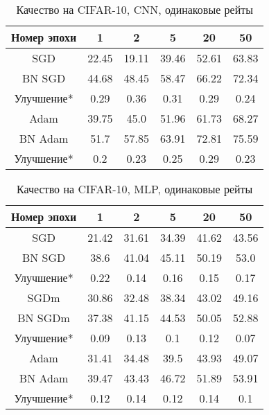 \documentclass[12pt,oneside]{article}
\begin{document}
\begin{table}
\centering
\begin{tabular}{|c|c|c|c|c|c|}\hline
Номер эпохи & 1 & 2 & 5 & 20 & 50 \\\hline
SGD & 22.45 & 19.11 & 39.46 & 52.61 & 63.83 \\\hline
BN SGD & 44.68 & 48.45 & 58.47 & 66.22 & 72.34 \\\hline
Улучшение* & 0.29 & 0.36 & 0.31 & 0.29 & 0.24 \\\hline
Adam & 39.75 & 45.0 & 51.96 & 61.73 & 68.27 \\\hline
BN Adam & 51.7 & 57.85 & 63.91 & 72.81 & 75.59 \\\hline
Улучшение* & 0.2 & 0.23 & 0.25 & 0.29 & 0.23 \\\hline
\end{tabular}
\caption{Качество на CIFAR-10, CNN, одинаковые рейты}
\end{table}

\begin{table}
\centering
\begin{tabular}{|c|c|c|c|c|c|}\hline
Номер эпохи & 1 & 2 & 5 & 20 & 50 \\\hline
SGD & 21.42 & 31.61 & 34.39 & 41.62 & 43.56 \\\hline
BN SGD & 38.6 & 41.04 & 45.11 & 50.19 & 53.0 \\\hline
Улучшение* & 0.22 & 0.14 & 0.16 & 0.15 & 0.17 \\\hline
SGDm & 30.86 & 32.48 & 38.34 & 43.02 & 49.16 \\\hline
BN SGDm & 37.38 & 41.15 & 44.53 & 50.05 & 52.88 \\\hline
Улучшение* & 0.09 & 0.13 & 0.1 & 0.12 & 0.07 \\\hline
Adam & 31.41 & 34.48 & 39.5 & 43.93 & 49.07 \\\hline
BN Adam & 39.47 & 43.43 & 46.72 & 51.89 & 53.91 \\\hline
Улучшение* & 0.12 & 0.14 & 0.12 & 0.14 & 0.1 \\\hline
\end{tabular}
\caption{Качество на CIFAR-10, MLP, одинаковые рейты}
\end{table}
\end{document}
